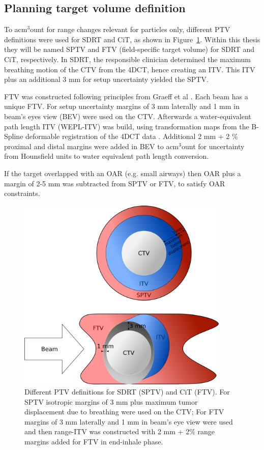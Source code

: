 \documentclass[type=dr, dr=rernat, acm$^3$entcolor=tud7b,colorbacktitle, bigchapter, openright, twoside, 12pt ]{tudthesis}
\begin{document}
\subsection{Planning target volume definition}

To acm$^3$ount for range changes relevant for particles only, different PTV definitions were used for SDRT and CiT, as shown in Figure~\ref{Fig:PTV_def}. 
Within this thesis they will be named SPTV and FTV (field-specific target volume) for SDRT and CiT, respectively.
In SDRT, the responsible clinician determined the maximum breathing motion of the CTV from the 4DCT, hence creating an ITV. This ITV plus an additional 3 mm for setup uncertainty yielded the SPTV.

FTV was constructed following principles from Graeff et al \cite{Graeff2012}. Each beam has a unique FTV. For setup uncertainty margins of 3 mm laterally and 1 mm in beam’s eyes view (BEV) were used on the CTV. 
Afterwards a water-equivalent path length ITV (WEPL-ITV) was build, using transformation maps from the B-Spline deformable registration of the 4DCT data \cite{Shackleford2010}. Additional 2 mm + 2 \% proximal and distal margins 
were added in BEV to acm$^3$ount for uncertainty from Hounsfield units to water equivalent path length conversion.

If the target overlapped with an OAR (e.g. small airways) then OAR plus a margin of 2-5 mm was subtracted from SPTV or FTV, to satisfy OAR constraints.

\begin{figure}[H]
\begin{center}
\includegraphics[width=0.9\textwidth]{./Images/PTV_definition.png}
\caption{Different PTV definitions for SDRT (SPTV) and CiT (FTV). For SPTV isotropic margins of 3 mm plus maximum tumor displacement due to 
breathing were used on the CTV; For FTV margins of 3 mm laterally and 1 mm in beam’s eye view were used and then range-ITV was constructed with
2 mm + 2\% range margins added for FTV in end-inhale phase.}
\label{Fig:PTV_def}
\end{center}
\end{figure}
\end{document}
